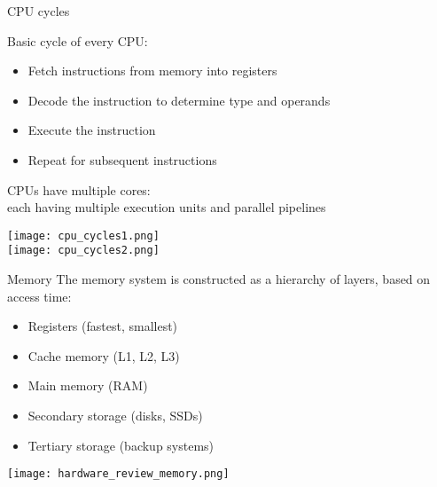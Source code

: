 \begin{concept}{CPU cycles}

    \begin{minipage}{0.6\linewidth}
    Basic cycle of every CPU:    
    \begin{itemize}
        \item Fetch instructions from memory into registers
        \item Decode the instruction to determine type and operands
        \item Execute the instruction
        \item Repeat for subsequent instructions
    \end{itemize}
    CPUs have multiple cores:\\
    each having multiple execution units and parallel pipelines
    \end{minipage}
    \begin{minipage}{0.35\linewidth}
    \vspace{-5mm}
    \texttt{[image: cpu\_cycles1.png]}\\
    \texttt{[image: cpu\_cycles2.png]}
    \end{minipage}
\end{concept}

\begin{definition}{Memory}
    The memory system is constructed as a hierarchy of layers, based on access time:

    \begin{minipage}{0.4\linewidth}
    \begin{itemize}
        \item Registers (fastest, smallest)
        \item Cache memory (L1, L2, L3)
        \item Main memory (RAM)
        \item Secondary storage (disks, SSDs)
        \item Tertiary storage (backup systems)
    \end{itemize}
    \end{minipage}
    \begin{minipage}{0.59\linewidth}
    \texttt{[image: hardware\_review\_memory.png]}
    \end{minipage}
\end{definition}

